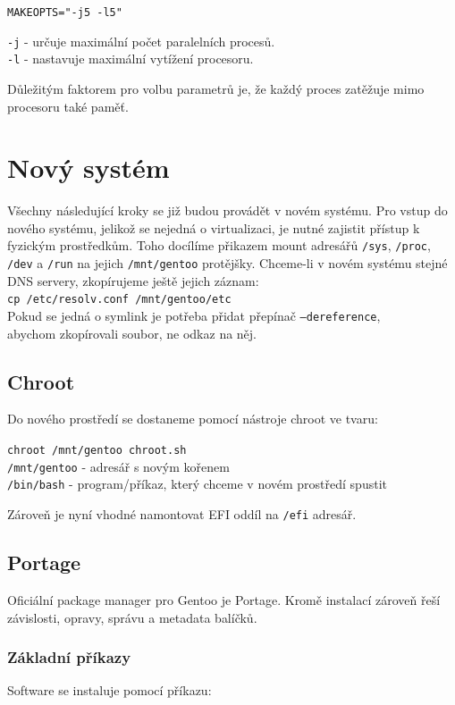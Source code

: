 \documentclass[12pt,a4paper,twoside,]{article}
\begin{document}
{\texttt{MAKEOPTS="-j5 -l5"}

\hspace{-1.5em}\texttt{-j} - určuje maximální počet paralelních procesů.\\
\texttt{-l} - nastavuje maximální vytížení procesoru.

\hspace{-1.5em}Důležitým faktorem pro volbu parametrů je, že každý proces zatěžuje mimo procesoru také paměť.

\newpage
\section{\textsf{Nový systém}}
Všechny následující kroky se již budou provádět v novém systému.
Pro vstup do nového systému, jelikož se nejedná o virtualizaci, je nutné zajistit přístup k fyzickým prostředkům.
Toho docílíme přikazem mount adresářů \texttt{/sys}, \texttt{/proc}, \texttt{/dev} a \texttt{/run} na jejich \texttt{/mnt/gentoo} protějšky. Chceme-li v novém 
systému stejné DNS servery, zkopírujeme ještě jejich záznam: \\ \texttt{cp /etc/resolv.conf /mnt/gentoo/etc}\\ Pokud se jedná o symlink
je potřeba přidat přepínač  \texttt{--dereference}, 
\\abychom zkopírovali soubor, ne odkaz na něj. 
\subsection{\textsf{Chroot}}
Do nového prostředí se dostaneme pomocí nástroje chroot ve tvaru:

\texttt{chroot /mnt/gentoo chroot.sh}\\
\texttt{/mnt/gentoo} - adresář s novým kořenem\\
\texttt{/bin/bash} - program/příkaz, který chceme v novém prostředí spustit

Zároveň je nyní vhodné namontovat EFI oddíl na \texttt{/efi} adresář.

\subsection{\textsf{Portage}}
Oficiální package manager pro Gentoo je Portage. Kromě instalací zároveň řeší závislosti, opravy, správu a metadata balíčků.
\subsubsection{\textsf{Základní příkazy}}
Software se instaluje pomocí příkazu:  

}
\end{document}
